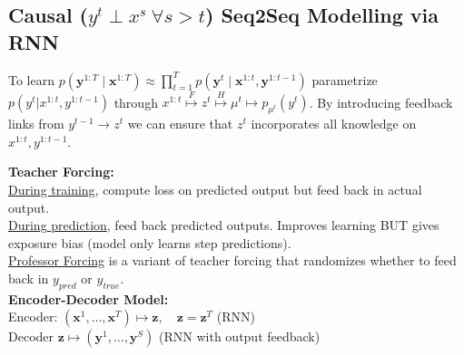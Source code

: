 \subsection*{Causal ($y^t \perp x^s\ \forall s > t$) Seq2Seq Modelling via RNN}
To learn $p(\mathbf y^{1:T}\mid \mathbf x^{1:T})\approx \prod_{t=1}^Tp(\mathbf y^t\mid \mathbf x^{1:t}, \mathbf y^{1:t-1})$ parametrize $p(y^t | x^{1:t}, y^{1:t-1})$ through $x^{1:t} \overset{F}{\mapsto} z^t \overset{H}{\mapsto} \mu^t \mapsto p_{\mu^t}(y^t)$. By introducing feedback links from $y^{t-1} \to z^t$ we can ensure that $z^t$ incorporates all knowledge on $x^{1:t}, y^{1:t-1}$.

\textbf{Teacher Forcing:}\\
\underline{During training}, compute loss on predicted output but feed back in actual output. \\
\underline{During prediction}, feed back predicted outputs. Improves learning BUT gives exposure bias (model only learns step predictions). \\
\underline{Professor Forcing} is a variant of teacher forcing that randomizes whether to feed back in $y_{pred}$ or $y_{true}$.\\
\textbf{Encoder-Decoder Model:} \\[2pt]
Encoder: $(\mathbf x^1,...,\mathbf x^T)\mapsto \mathbf z, \quad \mathbf z=\mathbf z^T$ (RNN)\\
Decoder $\mathbf z\mapsto (\mathbf y^1,...,\mathbf y^S)$ (RNN with output feedback)
\newcolumn
